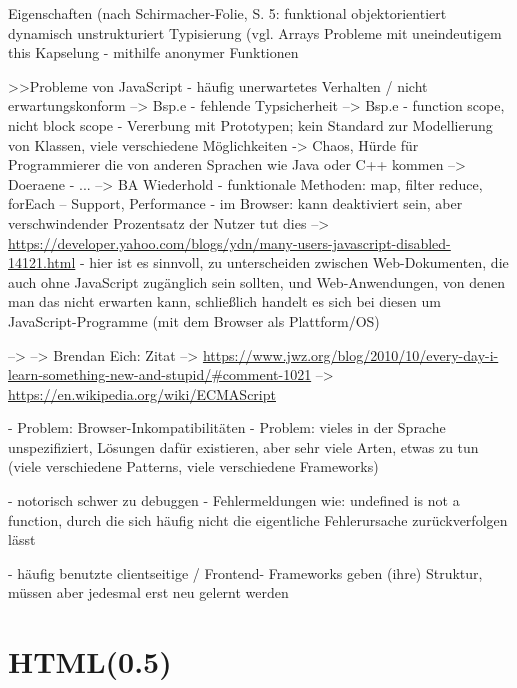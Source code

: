 \documentclass[a4paper, 12pt, hidelinks, listof=totoc, listoftables=totoc, bibliography=totoc]{scrreprt}
\begin{document}
Eigenschaften (nach Schirmacher-Folie, S. 5: %
	funktional
	objektorientiert
	dynamisch
	unstrukturiert
	Typisierung (vgl. %
	Arrays
	Probleme mit uneindeutigem this
	Kapselung - mithilfe anonymer Funktionen
	
                             
>>Probleme von JavaScript
- häufig unerwartetes Verhalten / nicht erwartungskonform  -->  Bsp.e
- fehlende Typsicherheit  -->  Bsp.e
- function scope, nicht block scope
- Vererbung mit Prototypen; kein Standard zur Modellierung von Klassen, viele verschiedene Möglichkeiten  ->  Chaos, Hürde für Programmierer die von anderen Sprachen wie Java oder C++ kommen
-->  Doeraene
- ...
-->  BA Wiederhold
- funktionale Methoden: map, filter reduce, forEach -- Support, Performance
- im Browser: kann deaktiviert sein, aber verschwindender Prozentsatz der Nutzer tut dies  -->  \url{https://developer.yahoo.com/blogs/ydn/many-users-javascript-disabled-14121.html}
	- hier ist es sinnvoll, zu unterscheiden zwischen Web-Dokumenten, die auch ohne JavaScript zugänglich sein sollten, und Web-Anwendungen, von denen man das nicht erwarten kann, schließlich handelt es sich bei diesen um JavaScript-Programme (mit dem Browser als Plattform/OS)
	\cite[S.311]{flanagan2011.JDG}

-->  \cite{flanagan2011.JDG}
-->  \cite{crockford2008.JSG}
Brendan Eich: Zitat  -->  \url{https://www.jwz.org/blog/2010/10/every-day-i-learn-something-new-and-stupid/#comment-1021}
-->  \url{https://en.wikipedia.org/wiki/ECMAScript}

- Problem: Browser-Inkompatibilitäten
- Problem: vieles in der Sprache unspezifiziert, Lösungen dafür existieren, aber sehr viele Arten, etwas zu tun (viele verschiedene Patterns, viele verschiedene Frameworks)

- notorisch schwer zu debuggen - Fehlermeldungen wie: undefined is not a function, durch die sich häufig nicht die eigentliche Fehlerursache zurückverfolgen lässt


- häufig benutzte clientseitige / Frontend- Frameworks geben (ihre) Struktur, müssen aber jedesmal erst neu gelernt werden


\section{HTML(0.5)}

\end{document}
